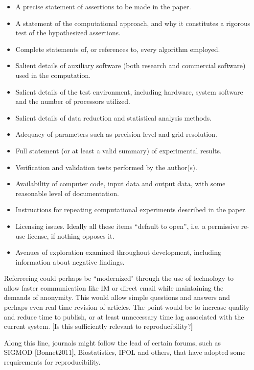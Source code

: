 \documentclass[11pt]{article}
\newcommand{\comment}[1]{{\color{blue} [#1]}}
\newcommand{\comment}[1]{}
\begin{document}
\begin{itemize} 
\item  A precise statement of assertions to be made in the paper.
\item  A statement of the computational approach, and why it constitutes a
rigorous test of the hypothesized assertions.
\item  Complete statements of, or references to, every algorithm employed.
\item  Salient details of auxiliary software (both research and commercial
software) used in the computation.
\item  Salient details of the test environment, including hardware, system
software and the number of processors utilized.
\item  Salient details of data reduction and statistical analysis methods.
\item  Adequacy of parameters such as precision level and grid resolution.
\item  Full statement (or at least a valid summary) of experimental results.
\item  Verification and validation tests performed by the author(s).
\item Availability of computer code, input data and output data, with some
reasonable level of documentation.
\item Instructions for repeating computational experiments described in the
paper.
\item Licensing issues. Ideally all these items ``default to open'',
 i.e. a permissive re-use license, if nothing opposes it.
\item Avenues of exploration examined throughout development, including
information about negative findings.
\end{itemize} 

Referreeing could perhaps be ``modernized" through the use of technology to
allow faster communication like IM or direct email while
maintaining the demands of anonymity.  This would allow simple questions and
answers and perhaps even real-time revision of articles.  The point would be
to increase quality and reduce time to publish, or at least unnecessary time
lag associated with the current system. \comment{Is this sufficiently
relevant to reproducibility?}

Along this line, journals might follow the lead of certain forums, such as
SIGMOD [Bonnet2011], Biostatistics, IPOL and others, that have adopted some
requirements for reproducibility. 
\end{document}
